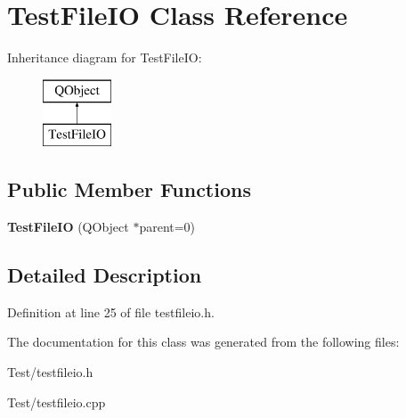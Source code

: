 \hypertarget{class_test_file_i_o}{}\section{Test\+File\+IO Class Reference}
\label{class_test_file_i_o}
Inheritance diagram for Test\+File\+IO\+:\begin{figure}[H]
\begin{center}
\leavevmode
\includegraphics[height=2.000000cm]{class_test_file_i_o}
\end{center}
\end{figure}
\subsection*{Public Member Functions}
\begin{DoxyCompactItemize}
\item 
{\bfseries Test\+File\+IO} (Q\+Object $\ast$parent=0)\hypertarget{class_test_file_i_o_a7d041deecab4857b73fdbecd2538c633}{}\label{class_test_file_i_o_a7d041deecab4857b73fdbecd2538c633}

\end{DoxyCompactItemize}


\subsection{Detailed Description}


Definition at line 25 of file testfileio.\+h.



The documentation for this class was generated from the following files\+:\begin{DoxyCompactItemize}
\item 
Test/testfileio.\+h\item 
Test/testfileio.\+cpp\end{DoxyCompactItemize}
